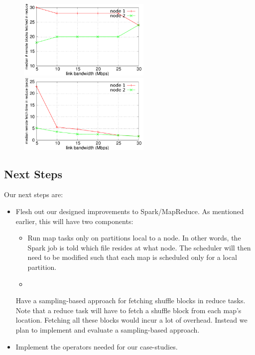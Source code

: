 \begin{figure}[ht]
	\centering
	\begin{minipage}[b]{0.48\linewidth}
		\includegraphics[width=2.5in]{figs/reduce-blocks.pdf}
		\caption{}
		\label{fig:reduce-blocks}
	\end{minipage}
	\quad
	\begin{minipage}[b]{0.48\linewidth}
		\includegraphics[width=2.5in]{figs/reduce-time.pdf}
		\caption{}
		\label{fig:reduce-time}
	\end{minipage}
\end{figure}

\subsection{Next Steps}

Our next steps are:

\begin{itemize}
\item Flesh out our designed improvements to Spark/MapReduce. As mentioned earlier, this will have two components:
\begin{itemize}
\item Run map tasks only on partitions local to a node. In other words, the Spark job is told which file resides at what node. The scheduler will then need to be modified such that each map is scheduled only for a local partition.
\item    
\end{itemize} Have a sampling-based approach for fetching shuffle blocks in reduce tasks. Note that a reduce task will have to fetch a shuffle block from each map's location. Fetching all these blocks would incur a lot of overhead. Instead we plan to implement and evaluate a sampling-based approach.
\item Implement the operators needed for our case-studies.
\end{itemize}


